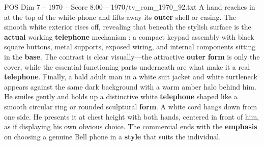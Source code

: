 \begin{textsample}{POS Dim 7 – 1970 – Score 8.00 – 1970/tv\_com\_1970\_92.txt}
A hand reaches in at the top of the white phone and lifts away its \textbf{outer} shell or casing.
The smooth white exterior rises off, revealing that beneath the stylish surface is the \textbf{actual} working \textbf{telephone} mechanism : a compact keypad assembly with black square buttons, metal supports, exposed wiring, and internal components sitting in the \textbf{base}.
The contrast is clear visually—the attractive \textbf{outer} \textbf{form} is only the cover, while the essential functioning parts underneath are what make it a real \textbf{telephone}.
Finally, a bald adult man in a white suit jacket and white turtleneck appears against the same dark background with a warm amber halo behind him.
He smiles gently and holds up a distinctive white \textbf{telephone} shaped like a smooth circular ring or rounded sculptural \textbf{form}.
A white cord hangs down from one side.
He presents it at chest height with both hands, centered in front of him, as if displaying his own obvious choice.
The commercial ends with the \textbf{emphasis} on choosing a genuine Bell phone in a \textbf{style} that suits the individual.

\end{textsample}
